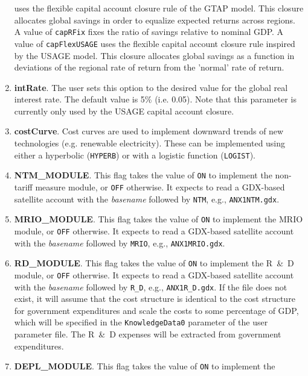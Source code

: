 \begin{enumerate}
         uses the flexible capital account closure rule of the GTAP model. This
         closure allocates global savings in order to equalize expected returns
         across regions. A value of \texttt{capRFix} fixes the ratio of savings
         relative to nominal GDP. A value of \texttt{capFlexUSAGE} uses the flexible
         capital account closure rule inspired by the USAGE model. This closure
         allocates global savings as a function in deviations of the regional
         rate of return from the 'normal' rate of return.
   \item \textbf{intRate}. The user sets this option to the desired value for
         the global real interest rate. The default value is 5\% (i.e. 0.05).
         Note that this parameter is currently only used by the USAGE capital
         account closure.
   \item \textbf{costCurve}. Cost curves are used to implement downward trends
         of new technologies (e.g. renewable electricity). These can be
         implemented using either a hyperbolic (\texttt{HYPERB}) or with a logistic
         function (\texttt{LOGIST}).
   \item \textbf{NTM\_MODULE}. This flag takes the value of \texttt{ON} to implement the
   		 non-tariff measure module, or \texttt{OFF} otherwise. It expects
           to read a GDX-based satellite account with the \emph{basename} followed
           by \texttt{NTM}, e.g., \texttt{ANX1NTM.gdx}.
   \item \textbf{MRIO\_MODULE}. This flag takes the value of \texttt{ON} to implement the
   		 MRIO module, or \texttt{OFF} otherwise. It expects
           to read a GDX-based satellite account with the \emph{basename} followed
           by \texttt{MRIO}, e.g., \texttt{ANX1MRIO.gdx}.
   \item \textbf{RD\_MODULE}. This flag takes the value of \texttt{ON} to implement the
   		 R~\&~D module, or \texttt{OFF} otherwise. It expects
           to read a GDX-based satellite account with the \emph{basename} followed
           by \texttt{R\_D}, e.g., \texttt{ANX1R\_D.gdx}. If the file
           does not exist, it will assume that the cost structure is
           identical to the cost structure for government expenditures
           and scale the costs to some percentage of GDP, which will
           be specified in the \texttt{KnowledgeData0} parameter
           of the user parameter file. The R~\&~D expenses will
           be extracted from government expenditures.
   \item \textbf{DEPL\_MODULE}. This flag takes the value of \texttt{ON} to implement the

\end{enumerate}
